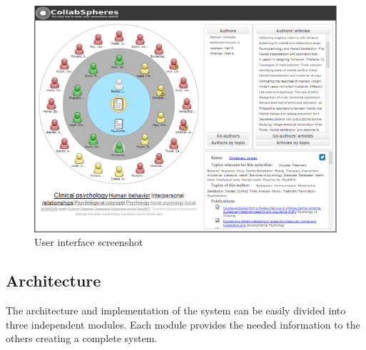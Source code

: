 \begin{figure}[!hbt]
\centering
\includegraphics[scale=0.3]{img/CollabAPA.png}
\caption{User interface screenshot}
\label{fig:screenshot}
\end{figure}

\subsection{Architecture}
The architecture and implementation of the system can be easily divided into three independent modules. Each module provides the needed information to the others creating a complete system.

